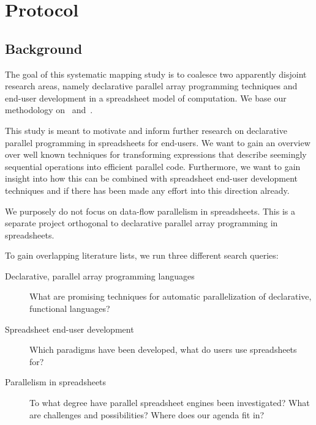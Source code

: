 \documentclass[a4paper]{article}
\begin{document}
\appendix

\newpage{}

\section{Protocol}
\label{sec:protocol}

\subsection{Background}
\label{sec:background}

The goal of this systematic mapping study is to coalesce two
apparently disjoint research areas, namely declarative parallel array
programming techniques and end-user development in a spreadsheet model
of computation. We base our methodology on~\citet{keele2007guidelines}
and~\citet{petersen2008systematic}.

This study is meant to motivate and inform further research on
declarative parallel programming in spreadsheets for end-users. We
want to gain an overview over well known techniques for transforming
expressions that describe seemingly sequential operations into
efficient parallel code. Furthermore, we want to gain insight into how
this can be combined with spreadsheet end-user development techniques
and if there has been made any effort into this direction
already. 

We purposely do not focus on data-flow parallelism in
spreadsheets. This is a separate project orthogonal to declarative
parallel array programming in spreadsheets.

To gain overlapping literature lists, we run three different search queries:

\begin{description}
\item[Declarative, parallel array programming languages] What are
  promising techniques for automatic parallelization of declarative,
  functional languages?
\item[Spreadsheet end-user development] Which paradigms have been
  developed, what do users use spreadsheets for?
\item[Parallelism in spreadsheets] To what degree have parallel
  spreadsheet engines been investigated? What are challenges and
  possibilities? Where does our agenda fit in?
\end{description}
\end{document}
